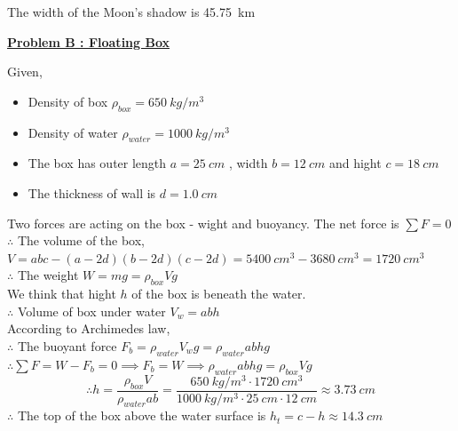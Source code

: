\documentclass{article}
\begin{document}
\begin{tcolorbox}[
    enhanced,
    attach boxed title to top center={yshift=-3mm,yshifttext=-1mm},
    colback=black,
    colframe=aquamarine!50!aquablue,
    coltitle=blue!70!black,
    colbacktitle=aquablue,
    title=Answer,
    fonttitle=\bfseries,
    boxed title style={size=small,colframe=blue},
    coltext=ivory!85!aquablue
]
   \centerline{The width of the Moon’s shadow is \qty{45.75}{km}}
\end{tcolorbox}
\vspace{1cm}
\begin{center}
    {\large \bfseries \color{aquablue!80!blue} \underline{Problem B : Floating Box}}
\end{center}
Given,
\begin{itemize}
    \item Density of box $\rho_{box} = \qty{650}{kg/m^3}$ 
    \item Density of water $\rho_{water} = \qty{1000}{kg/m^3}$
    \item The box has outer length $a=\qty{25}{cm}$ , width $b=\qty{12}{cm}$ and hight $c=\qty{18}{cm}$
    \item The thickness of wall is $d=\qty{1.0}{cm}$
\end{itemize}
Two forces are acting on the box - wight and buoyancy. The net force is $\sum F =0$\\
$\therefore$ The volume of the box,\\ $V=abc-(a-2d)(b-2d)(c-2d)=\qty{5400}{cm^3}-\qty{3680}{cm^3}=\qty{1720}{cm^3}$\\
$\therefore$ The weight $W=mg=\rho_{box} V g$\\
We think that hight $h$ of the box is beneath the water.\\
$\therefore$ Volume of box under water $V_w=abh$\\
According to Archimedes law,\\
$\therefore$ The buoyant force $F_b=\rho_{water}V_wg=\rho_{water}abhg$\\
$\therefore\sum F= W-F_b=0 \implies F_b=W \implies \rho_{water}abhg=\rho_{box} V g$\\
$$\therefore h = \frac{\rho_{box} V }{\rho_{water}ab}=\frac{\qty{650}{kg/m^3}\cdot \qty{1720}{cm^3} }{\qty{1000}{kg/m^3}\cdot \qty{25}{cm} \cdot \qty{12}{cm}}\approx\qty{3.73}{cm}$$
$\therefore$ The top of the box above the water surface is $h_t=c-h\approx\qty{14.3}{cm}$
\end{document}
